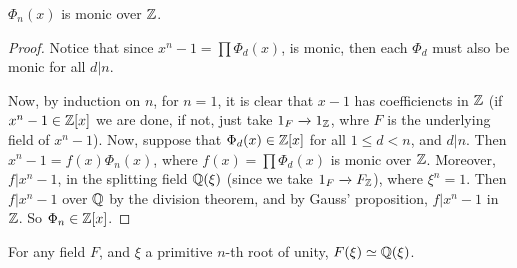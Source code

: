 \begin{proposition}\label{proposition_8.7.6}
  $\Phi_n(x)$ is monic over $\mathbb{Z}$.
\end{proposition}
\begin{proof}
  Notice that since $x^n-1=\prod{\Phi_d(x)}$, is monic, then each $\Phi_d$
  must also be monic for all  $d|n$.

  Now, by induction on $n$, for  $n=1$, it is clear that  $x-1$ has
  coefficiencts in  $\mathbb{Z}$  (if $x^n-1 \in \mathbb{Z}[x]$ we are done, if not, just take
  $1_F \xrightarrow{} 1_{\mathbb{Z}}$, whre $F$ is the underlying field of  $x^n-1$).
  Now, suppose that $\Phi_d(x) \in \mathbb{Z}[x]$ for all $1 \leq d <n$, and  $d|n$.
  Then  $x^n-1=f(x)\Phi_n(x)$, where $f(x)=\prod{\Phi_d(x)}$ is monic over
  $\mathbb{Z}$. Moreover,  $f|x^n-1$, in the splitting field $\mathbb{Q}(\xi)$ (since we take
  $1_F \xrightarrow{} F_{\mathbb{Z}}$), where $\xi^n=1$. Then  $f|x^n-1$ over  $\mathbb{Q}$ by
  the division theorem, and by Gauss' proposition, $f|x^n-1$ in $\mathbb{Z}$. So $\Phi_n \in
  \mathbb{Z}[x]$.
\end{proof}
\begin{corollary}
  For any field $F$, and  $\xi$ a primitive $n$-th root of unity,
  $F(\xi) \simeq \mathbb{Q}(\xi)$.
\end{corollary}


